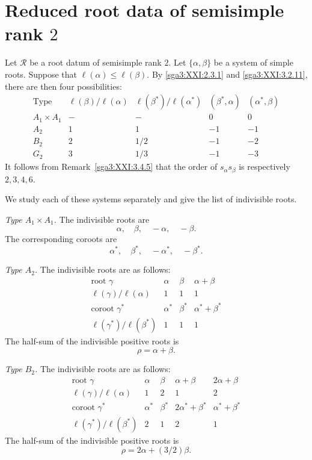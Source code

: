 \section{Reduced root data of semisimple rank \(2\)}
\label{sga3:XXI:4}

\renewcommand{\thetheorem}{\thesection.\arabic{theorem}}
\setcounter{theorem}{0}

Let \(\mathcal{R}\) be a root datum of semisimple rank \(2\). Let
\(\{\alpha,\beta\}\) be a system of simple roots. Suppose that
\(\ell(\alpha)\le\ell(\beta)\). By
\ref{sga3:XXI:2.3.1} and \ref{sga3:XXI:3.2.11}, there are then four
possibilities:
\[
\begin{array}{c|c|c|c|c}
\text{Type}
 &\ell(\beta)/\ell(\alpha)
 &\ell(\beta^\ast)/\ell(\alpha^\ast)
 &(\beta^\ast,\alpha)
 &(\alpha^\ast,\beta)\\ \hline
A_1\times A_1&-&-&0&0\\
A_2&1&1&-1&-1\\
B_2&2&1/2&-1&-2\\
G_2&3&1/3&-1&-3
\end{array}
\]
It follows from Remark~\ref{sga3:XXI:3.4.5} that the order of
\(s_\alpha s_\beta\) is respectively \(2,3,4,6\).

We study each of these systems separately and give the list of
indivisible roots.

\medskip
\noindent\emph{Type \(A_1\times A_1\).}
The indivisible roots are
\[
 \alpha,\quad\beta,\quad-\alpha,\quad-\beta.
\]
The corresponding coroots are
\[
 \alpha^\ast,\quad\beta^\ast,\quad-\alpha^\ast,\quad-\beta^\ast.
\]

\medskip
\noindent\emph{Type \(A_2\).}
The indivisible roots are as follows:
\[
\begin{array}{c|ccc}
\text{root }\gamma
 &\alpha&\beta&\alpha+\beta\\ \hline
\ell(\gamma)/\ell(\alpha)
 &1&1&1\\ \hline
\text{coroot }\gamma^\ast
 &\alpha^\ast&\beta^\ast&\alpha^\ast+\beta^\ast\\ \hline
\ell(\gamma^\ast)/\ell(\beta^\ast)
 &1&1&1
\end{array}
\]
The half-sum of the indivisible positive roots is
\[
 \rho=\alpha+\beta.
\]

\medskip
\noindent\emph{Type \(B_2\).}
The indivisible roots are as follows:
\[
\begin{array}{c|cccc}
\text{root }\gamma
 &\alpha&\beta&\alpha+\beta&2\alpha+\beta\\ \hline
\ell(\gamma)/\ell(\alpha)
 &1&2&1&2\\ \hline
\text{coroot }\gamma^\ast
 &\alpha^\ast&\beta^\ast
 &2\alpha^\ast+\beta^\ast&\alpha^\ast+\beta^\ast\\ \hline
\ell(\gamma^\ast)/\ell(\beta^\ast)
 &2&1&2&1
\end{array}
\]
The half-sum of the indivisible positive roots is
\[
 \rho=2\alpha+(3/2)\beta.
\]

